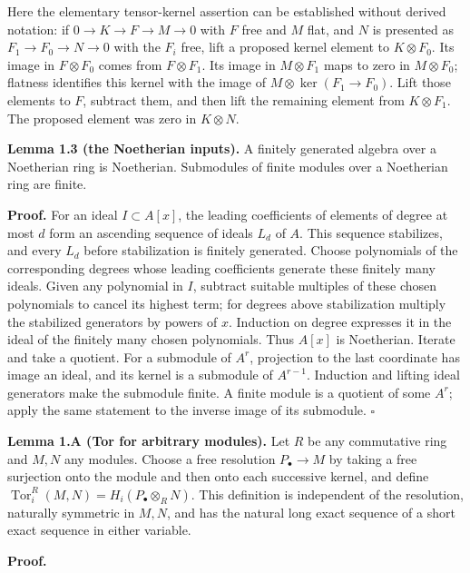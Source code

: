 \documentclass[11pt,a4paper,openany]{report}
\begin{document}
Here the elementary tensor-kernel assertion can be established without derived notation: if \(0\to K\to F\to M\to0\) with \(F\) free and \(M\) flat, and \(N\) is presented as \(F_1\to F_0\to N\to0\) with the \(F_i\) free, lift a proposed kernel element to \(K\otimes F_0\). Its image in \(F\otimes F_0\) comes from \(F\otimes F_1\). Its image in \(M\otimes F_1\) maps to zero in \(M\otimes F_0\); flatness identifies this kernel with the image of \(M\otimes\ker(F_1\to F_0)\). Lift those elements to \(F\), subtract them, and then lift the remaining element from \(K\otimes F_1\). The proposed element was zero in \(K\otimes N\).

\textbf{Lemma 1.3 (the Noetherian inputs).} A finitely generated algebra over a Noetherian ring is Noetherian. Submodules of finite modules over a Noetherian ring are finite.

\textbf{Proof.} For an ideal \(I\subset A[x]\), the leading coefficients of elements of degree at most \(d\) form an ascending sequence of ideals \(L_d\) of \(A\). This sequence stabilizes, and every \(L_d\) before stabilization is finitely generated. Choose polynomials of the corresponding degrees whose leading coefficients generate these finitely many ideals. Given any polynomial in \(I\), subtract suitable multiples of these chosen polynomials to cancel its highest term; for degrees above stabilization multiply the stabilized generators by powers of \(x\). Induction on degree expresses it in the ideal of the finitely many chosen polynomials. Thus \(A[x]\) is Noetherian. Iterate and take a quotient. For a submodule of \(A^r\), projection to the last coordinate has image an ideal, and its kernel is a submodule of \(A^{r-1}\). Induction and lifting ideal generators make the submodule finite. A finite module is a quotient of some \(A^r\); apply the same statement to the inverse image of its submodule. \(\square\)

\label{AG-RG-S01-tor-calculus}

\textbf{Lemma 1.A (Tor for arbitrary modules).} Let \(R\) be any commutative ring and \(M,N\) any modules. Choose a free resolution \(P_\bullet\to M\) by taking a free surjection onto the module and then onto each successive kernel, and define \(\operatorname{Tor}_i^R(M,N)=H_i(P_\bullet\otimes_R N)\). This definition is independent of the resolution, naturally symmetric in \(M,N\), and has the natural long exact sequence of a short exact sequence in either variable.

\textbf{Proof.}
\end{document}
